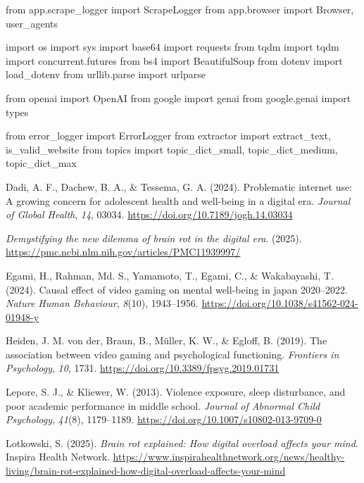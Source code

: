 \documentclass[
  titlepage]{article}
\newlength{\cslhangindent}
\newenvironment{CSLReferences}[2] %
 {\begin{list}{}{%
  \setlength{\itemindent}{0pt}
  \setlength{\leftmargin}{0pt}
  \setlength{\parsep}{0pt}
  \ifodd #1
   \setlength{\leftmargin}{\cslhangindent}
   \setlength{\itemindent}{-1\cslhangindent}
  \fi
  \setlength{\itemsep}{#2\baselineskip}}}
 {\end{list}}
\begin{document}
from app.scrape\_logger import ScrapeLogger from app.browser import
Browser, user\_agents

import os import sys import base64 import requests from tqdm import tqdm
import concurrent.futures from bs4 import BeautifulSoup from dotenv
import load\_dotenv from urllib.parse import urlparse

from openai import OpenAI from google import genai from google.genai
import types

from error\_logger import ErrorLogger from extractor import
extract\_text, is\_valid\_website from topics import topic\_dict\_small,
topic\_dict\_medium, topic\_dict\_max

\label{refs}
\begin{CSLReferences}{1}{0}
Dadi, A. F., Dachew, B. A., \& Tessema, G. A. (2024). Problematic
internet use: A growing concern for adolescent health and well-being in
a digital era. \emph{Journal of Global Health}, \emph{14}, 03034.
\url{https://doi.org/10.7189/jogh.14.03034}

\emph{Demystifying the new dilemma of brain rot in the digital era}.
(2025). \url{https://pmc.ncbi.nlm.nih.gov/articles/PMC11939997/}

Egami, H., Rahman, Md. S., Yamamoto, T., Egami, C., \& Wakabayashi, T.
(2024). Causal effect of video gaming on mental well-being in japan
2020--2022. \emph{Nature Human Behaviour}, \emph{8}(10), 1943--1956.
\url{https://doi.org/10.1038/s41562-024-01948-y}

Heiden, J. M. von der, Braun, B., Müller, K. W., \& Egloff, B. (2019).
The association between video gaming and psychological functioning.
\emph{Frontiers in Psychology}, \emph{10}, 1731.
\url{https://doi.org/10.3389/fpsyg.2019.01731}

Lepore, S. J., \& Kliewer, W. (2013). Violence exposure, sleep
disturbance, and poor academic performance in middle school.
\emph{Journal of Abnormal Child Psychology}, \emph{41}(8), 1179--1189.
\url{https://doi.org/10.1007/s10802-013-9709-0}

Lotkowski, S. (2025). \emph{Brain rot explained: How digital overload
affects your mind}. Inspira Health Network.
\url{https://www.inspirahealthnetwork.org/news/healthy-living/brain-rot-explained-how-digital-overload-affects-your-mind}


\end{CSLReferences}
\end{document}
